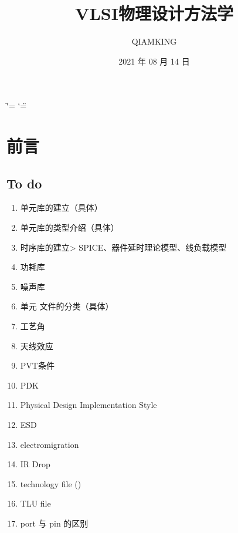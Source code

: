 \documentclass[letterpaper,10pt,english]{sphinxmanual}
\title{VLSI物理设计方法学}
\date{2021 年 08 月 14 日}
\author{QIAMKING}
\begin{document}
\ifdefined\shorthandoff
  \ifnum\catcode`\=\string=\active\shorthandoff{=}\fi
  \ifnum\catcode`\"=\active{}\fi
\fi

\pagestyle{empty}
\sphinxmaketitle
\pagestyle{plain}
\sphinxtableofcontents
\pagestyle{normal}
\label{\detokenize{index::doc}}



\chapter{前言}
\label{\detokenize{chapter1/index:id1}}\label{\detokenize{chapter1/index::doc}}

\section{To do}
\label{\detokenize{chapter1/To_Do:to-do}}\label{\detokenize{chapter1/To_Do::doc}}\begin{enumerate}
%
\item {} 
\sphinxAtStartPar
单元库的建立（具体）

\item {} 
\sphinxAtStartPar
单元库的类型介绍（具体）

\item {} 
\sphinxAtStartPar
时序库的建立\sphinxhyphen{}> SPICE、器件延时理论模型、线负载模型

\item {} 
\sphinxAtStartPar
功耗库

\item {} 
\sphinxAtStartPar
噪声库

\item {} 
\sphinxAtStartPar
单元  文件的分类（具体）

\item {} 
\sphinxAtStartPar
工艺角

\item {} 
\sphinxAtStartPar
天线效应

\item {} 
\sphinxAtStartPar
PVT条件

\item {} 
\sphinxAtStartPar
PDK

\item {} 
\sphinxAtStartPar
Physical Design Implementation Style

\item {} 
\sphinxAtStartPar
ESD

\item {} 
\sphinxAtStartPar
electromigration

\item {} 
\sphinxAtStartPar
IR Drop

\item {} 
\sphinxAtStartPar
technology file ()

\item {} 
\sphinxAtStartPar
TLU file

\item {} 
\sphinxAtStartPar
port 与 pin 的区别

\end{enumerate}
\end{document}
